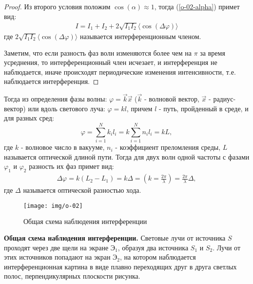 \begin{proof}
Из второго условия положим $\cos(\alpha)\approx 1$, тогда (\ref{o-02-alpha}) примет вид:
\begin{gather}
\label{o-02-mainint}
I = I_1 + I_2 + 2\sqrt{I_1 I_2}\langle\cos(\Delta \varphi)\rangle
\end{gather}
где $2\sqrt{I_1 I_2}\langle\cos(\Delta \varphi)\rangle$ называется интерференционным членом.

Заметим, что если разность фаз волн изменяются более чем на $\pi$ за время усреднения, то интерференционный член исчезает, и интерференция не наблюдается, иначе происходят периодические изменения интенсивности, т.е. наблюдается интерференция.
\end{proof}

Тогда из определения фазы волны: $\varphi = \vec{k}\vec{x}$ ($\vec{k}$ - волновой вектор, $\vec{x}$ - радиус-вектор) или вдоль светового луча: $\varphi = kl$, причем $l$ - путь, пройденный в среде, и для разных сред:
$$
\varphi = \sum_{i=1}^{N}k_i l_i = k\sum_{i=1}^{N}n_i l_i = kL,
$$
где $k$ - волновое число в вакууме, $n_i$ - коэффициент преломления среды, $L$ называется оптической длиной пути.
Тогда для двух волн одной частоты с фазами $\varphi_1$ и $\varphi_2$ разность их фаз примет вид:
\begin{gather}
\label{o-02-phasediff}
\Delta \varphi = k(L_2 - L_1) = k \Delta =
(k = \frac{2\pi}{\lambda}) =
\frac{2\pi}{\lambda}\Delta,
\end{gather}
где $\Delta$ называется оптической разностью хода. 

\begin{wrapfigure}[14]{R}{0.4\linewidth}
	\texttt{[image: img/o-02]}{}
	\caption{Общая схема наблюдения интерференции}
	\label{o-02-scheme}
\end{wrapfigure}
 
\textbf{Общая схема наблюдения интерференции.}
Световые лучи от источника $S$ проходят через две щели на экране $\text{Э}_1$, образуя два источника $S_1$ и $S_2$. Лучи от этих источников попадают на экран $\text{Э}_2$, на котором наблюдается интерференционная картина в виде плавно переходящих друг в друга светлых полос, перпендикулярных плоскости рисунка.

